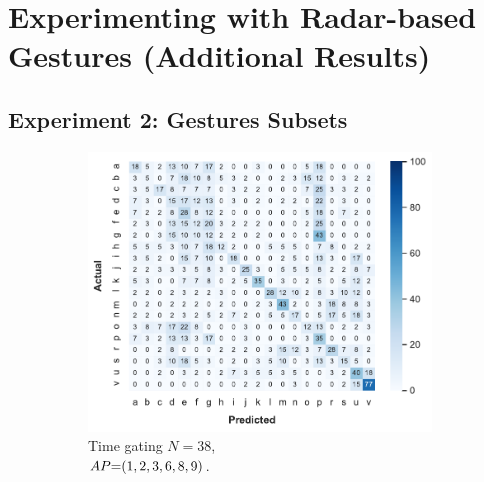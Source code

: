 \chapter{Experimenting with Radar-based Gestures (Additional Results)}
\label{app:radar-experiments}

\section{Experiment 2: Gestures Subsets}

\begin{figure}
  \centering
  \begin{subfigure}{.69\linewidth}
      \includegraphics[width=\linewidth]{Figures/RadarExperiments/Datasets/20Gestures/Results/All/UI-time-gating-cm.pdf}
      \vspace{-12pt}
      \caption{Time gating $N{=}38$, \\ $\splitatcommas{AP{=}(1, 2, 3, 6, 8, 9)}$.}
      \vspace{6pt}
      \label{fig:radar-experiments:confusion-exp1-UI-timegating}
  \end{subfigure}
  \begin{subfigure}{.69\linewidth}

\end{subfigure}
\end{figure}
